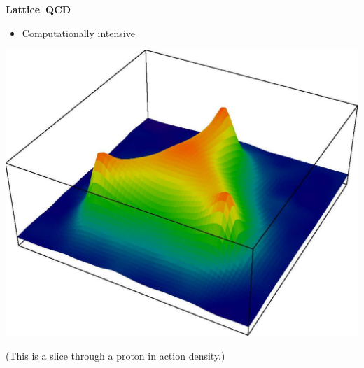 \documentclass[landscape]{article}
\newenvironment{slide}[1][ ]{\mbox{\bf #1 } \vfill}{\vfill \mbox{ } \pagebreak}
\begin{document}
\begin{slide}[Lattice QCD]
\begin{minipage}{0.5\linewidth}
\begin{itemize}
    \vspace{1 cm}
    \item Computationally intensive
  \end{itemize}
\end{minipage} \hfill \begin{minipage}{0.45\linewidth}
  \includegraphics[width=\linewidth]{qcd_proton}
  \begin{center} \large (This is a slice through a proton in action density.) \end{center}
\end{minipage}

\end{slide}
\end{document}
